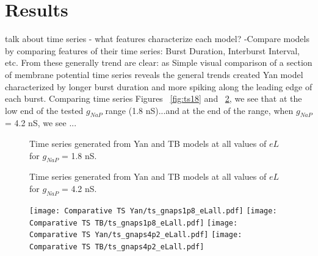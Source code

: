 \documentclass[11pt]{article}
\begin{document}
\oddsidemargin -0.22in
\evensidemargin -0.22in
\topmargin 0.05in
\topskip 0.25in
\headheight 0.05in
\headsep 0.25in

\graphicspath{{"../Data and Analysis/long TB Yan/plots/"}{"../Data and Analysis/short TB Yan/plots/"}}


\FloatBarrier
\section{Results}
talk about time series - what features characterize each model?
-Compare models by comparing features of their time series: Burst Duration, Interburst Interval, etc. 
From these generally trend are clear: as
Simple visual comparison of a section of membrane potential time series reveals the general trends created
Yan model characterized by longer burst duration and more spiking along the leading edge of each burst.
Comparing time series Figures ~\ref{fig:ts18} and ~\ref{fig:ts42}, we see that at the low end of the tested $g_{NaP}$ range (1.8 nS)...and at the end of the range, when $g_{NaP}$ = 4.2 nS, we see ...



\begin{figure}[h]
	\centering
	\caption{Time series generated from Yan and TB models at all values of $eL$ for $g_{NaP}$ = 1.8 nS.}
	\label{fig:ts18}
	\caption{Time series generated from Yan and TB models at all values of $eL$ for $g_{NaP}$ = 4.2 nS.}
	\label{fig:ts42}
\end{figure}

\begin{figure}[h]
	\centering
	\texttt{[image: Comparative TS Yan/ts\_gnaps1p8\_eLall.pdf]}
	\texttt{[image: Comparative TS TB/ts\_gnaps1p8\_eLall.pdf]}
	\texttt{[image: Comparative TS Yan/ts\_gnaps4p2\_eLall.pdf]}
	\texttt{[image: Comparative TS TB/ts\_gnaps4p2\_eLall.pdf]}
	\label{fig:ts42}
\end{figure}
\end{document}
